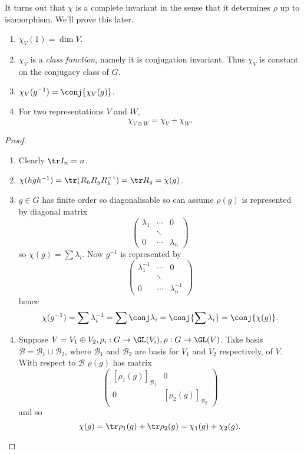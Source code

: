 \documentclass[a4paper]{article}
\theoremstyle{definition}
\begin{document}
It turns out that \(\chi\) is a complete invariant in the sense that it determines \(\rho\) up to isomorphism. We'll prove this later.

\begin{theorem}\leavevmode
  \begin{enumerate}
  \item \(\chi_V(1) = \dim V\).
  \item \(\chi_V\) is a \emph{class function}, namely it is conjugation invariant. Thus \(\chi_V\) is constant on the conjugacy class of \(G\).
  \item \(\chi_V(g^{-1}) = \conj{\chi_V(g)}\).
  \item For two representations \(V\) and \(W\),
    \[
      \chi_{V \oplus W} = \chi_V + \chi_W.
    \]
  \end{enumerate}
\end{theorem}

\begin{proof}\leavevmode
  \begin{enumerate}
  \item Clearly \(\tr I_n = n\).
  \item \(\chi(hgh^{-1}) = \tr(R_hR_gR_h^{-1}) = \tr R_g = \chi(g)\).
  \item \(g \in G\) has finite order so diagonalisable so can assume \(\rho(g)\) is represented by diagonal matrix
    \[
      \begin{pmatrix}
        \lambda_1 & \cdots & 0 \\
        & \ddots \\
        0 & \cdots & \lambda_n
      \end{pmatrix}
    \]
    so \(\chi(g) = \sum \lambda_i\). Now \(g^{-1}\) is represented by
    \[
      \begin{pmatrix}
        \lambda_1^{-1} & \cdots & 0 \\
        & \ddots \\
        0 & \cdots & \lambda_n^{-1}
      \end{pmatrix}
    \] 
    hence
    \[
      \chi(g^{-1}) = \sum \lambda_i^{-1} = \sum \conj \lambda_i = \conj{\sum \lambda_i} = \conj{\chi(g)}.
    \]
  \item Suppose \(V = V_1 \oplus V_2, \rho_i: G \to \GL(V_i), \rho: G \to \GL(V)\). Take basis \(\mathcal B = \mathcal B_1 \cup \mathcal B_2\), where \(\mathcal B_1\) and \(\mathcal B_2\) are basis for \(V_1\) and \(V_2\) respectively, of \(V\). With respect to \(\mathcal B\) \(\rho(g)\) has matrix
    \[
      \begin{pmatrix}
        [\rho_1(g)]_{\mathcal B_1} & 0 \\
        0 & [\rho_2(g)]_{\mathcal B_2}
      \end{pmatrix}
    \]
    and so
    \[
      \chi(g) = \tr \rho_1(g) + \tr \rho_2(g) = \chi_1(g) + \chi_2(g).
    \]
  \end{enumerate}
\end{proof}
\end{document}
